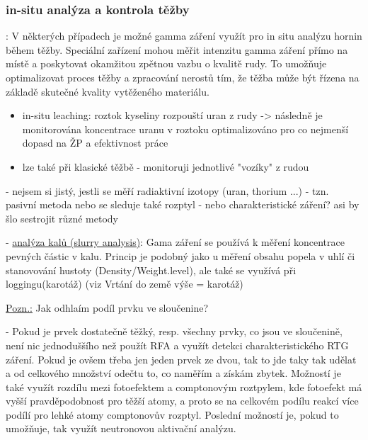 \subsubsection{in-situ analýza a kontrola těžby}: 
V některých případech je možné gamma záření využít pro in situ analýzu hornin během těžby. Speciální zařízení mohou měřit intenzitu gamma záření přímo na místě a poskytovat okamžitou zpětnou vazbu o kvalitě rudy. To umožňuje optimalizovat proces těžby a zpracování nerostů tím, že těžba může být řízena na základě skutečné kvality vytěženého materiálu.
\begin{itemize}
    \item in-situ leaching: roztok kyseliny rozpouští uran z rudy -> následně je monitorována koncentrace uranu v roztoku optimalizováno pro co nejmenší dopasd na ŽP a efektivnost práce
    \item lze také při klasické těžbě - monitoruji jednotlivé "vozíky" z rudou
    
\end{itemize}
- nejsem si jistý, jestli se měří radiaktivní izotopy (uran, thorium ...) - tzn. pasivní metoda nebo se sleduje také rozptyl - nebo charakteristické záření? asi by šlo sestrojit různé metody 

- \underline{analýza kalů (slurry analysis)}: Gama záření se používá k měření koncentrace pevných částic v kalu. Princip je podobný jako u měření obsahu popela v uhlí či stanovování hustoty (Density/Weight.level), ale také se využívá při loggingu(karotáž) (viz Vrtání do země výše = karotáž)

\underline{Pozn.:} Jak odhlaím podíl prvku ve sloučenine?

- Pokud je prvek dostatečně těžký, resp. všechny prvky, co jsou ve sloučenině, není nic jednoduššího než použít RFA a využít detekci charakteristického RTG záření. Pokud je ovšem třeba jen jeden prvek ze dvou, tak to jde taky tak udělat a od celkového množství odečtu to, co naměřím a získám zbytek. Možností je také využít rozdílu mezi fotoefektem a comptonovým roztpylem, kde fotoefekt má vyšší pravděpodobnost pro těžší atomy, a proto se na celkovém podílu reakcí více podílí pro lehké atomy comptonovův rozptyl. Poslední možností je, pokud to umožňuje, tak využít neutronovou aktivační analýzu.


